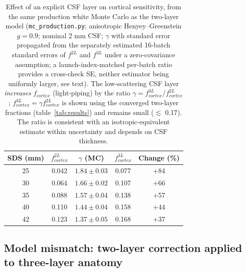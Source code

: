 \documentclass[11pt]{article}
\def\mathrm#1{#1}%
\def\,{ }%
\begin{document}
\begin{table}[ht]
\centering
\caption{Effect of an explicit CSF layer on cortical sensitivity, from the same production white Monte Carlo as the two-layer model (\texttt{mc\_production.py}; anisotropic Henyey--Greenstein $g=0.9$; nominal 2\,mm CSF; $\gamma$ with standard error propagated from the separately estimated 16-batch standard errors of $f^{\mathrm{2L}}$ and $f^{\mathrm{3L}}$ under a zero-covariance assumption; a launch-index-matched per-batch ratio provides a cross-check SE, neither estimator being uniformly larger, see text). The low-scattering CSF layer \textit{increases} $f_{\mathrm{cortex}}$ (light-piping) by the ratio $\gamma = f_{\mathrm{cortex}}^{\mathrm{3L}}/f_{\mathrm{cortex}}^{\mathrm{2L}}$; $f_{\mathrm{cortex}}^{\mathrm{3L}} = \gamma\,f_{\mathrm{cortex}}^{\mathrm{2L}}$ is shown using the converged two-layer fractions (table~\ref{tab:results}) and remains small ($\lesssim$\,0.17). The ratio is consistent with an isotropic-equivalent estimate within uncertainty and depends on CSF thickness.}
\label{tab:three_layer}
\begin{tabular}{@{}ccccc@{}}
\toprule
\textbf{SDS (mm)} & $f_{\mathrm{cortex}}^{\mathrm{2L}}$ & $\gamma$ (MC) & $f_{\mathrm{cortex}}^{\mathrm{3L}}$ & \textbf{Change (\%)} \\
\midrule
25 & 0.042 & $1.84\pm0.03$ & 0.077 & $+$84 \\
30 & 0.064 & $1.66\pm0.02$ & 0.107 & $+$66 \\
35 & 0.088 & $1.57\pm0.04$ & 0.138 & $+$57 \\
40 & 0.110 & $1.44\pm0.04$ & 0.158 & $+$44 \\
42 & 0.123 & $1.37\pm0.05$ & 0.168 & $+$37 \\
\bottomrule
\end{tabular}
\end{table}

\subsection{Model mismatch: two-layer correction applied to three-layer anatomy}
\label{sec:mismatch_results}
\end{document}
